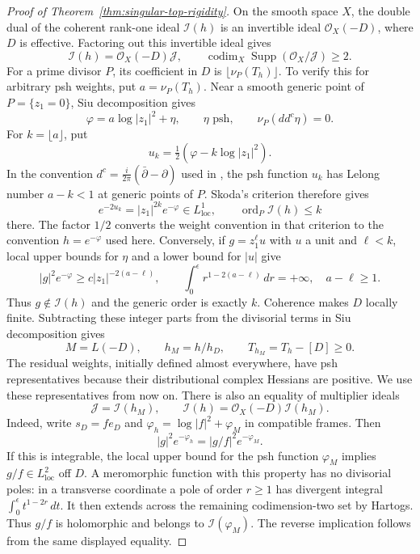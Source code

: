 \documentclass[11pt,reqno]{amsart}
\numberwithin{equation}{section}
\theoremstyle{definition}
\theoremstyle{remark}
\begin{document}
\begin{proof}[Proof of Theorem~\ref{thm:singular-top-rigidity}]
On the smooth space $X$, the double dual of the coherent rank-one ideal
$\mathcal I(h)$ is an invertible ideal $\mathcal O_X(-D)$, where $D$ is
effective. Factoring out this invertible ideal gives
\begin{equation}\label{eq:divisorial-ideal-factorization}
 \mathcal I(h)=\mathcal O_X(-D)\mathcal J,
 \qquad
 \operatorname{codim}_X
 \operatorname{Supp}(\mathcal O_X/\mathcal J)\geq2.
\end{equation}
For a prime divisor $P$, its coefficient in $D$ is
$\lfloor\nu_P(T_h)\rfloor$. To verify this for arbitrary psh weights,
put $a=\nu_P(T_h)$. Near a smooth generic point of $P=\{z_1=0\}$,
Siu decomposition gives
\[
 \varphi=a\log|z_1|^2+\eta,\qquad
 \eta\text{ psh},\qquad \nu_P(dd^c\eta)=0.
\]
For $k=\lfloor a\rfloor$, put
\[
 u_k=\tfrac12(\varphi-k\log|z_1|^2).
\]
In the convention $d^c=\tfrac{i}{2\pi}(\bar\partial-\partial)$
used in \cite{Dem12}, the psh function $u_k$ has Lelong number
$a-k<1$ at generic points of $P$.  Skoda's criterion
\cite[Lemma~5.6(a)]{Dem12} therefore gives
\[
 e^{-2u_k}=|z_1|^{2k}e^{-\varphi}\in L^1_{\mathrm{loc}},
 \qquad \operatorname{ord}_P\mathcal I(h)\leq k
\]
there.  The factor $1/2$ converts the weight convention in that
criterion to the convention $h=e^{-\varphi}$ used here.
Conversely, if $g=z_1^\ell u$ with $u$ a unit and $\ell<k$, local
upper bounds for $\eta$ and a lower bound for $|u|$ give
\[
 |g|^2e^{-\varphi}\geq c|z_1|^{-2(a-\ell)},\qquad
 \int_0^\epsilon r^{1-2(a-\ell)}\,dr=+\infty,
 \quad a-\ell\geq1.
\]
Thus $g\notin\mathcal I(h)$ and the generic order is exactly $k$.
Coherence makes $D$ locally finite. Subtracting these integer parts
from the divisorial terms in Siu decomposition gives
\begin{equation}\label{eq:residual-positive-current}
 M=L(-D),\qquad h_M=h/h_D,
 \qquad T_{h_M}=T_h-[D]\geq0.
\end{equation}
The residual weights, initially defined almost everywhere, have psh
representatives because their distributional complex Hessians are
positive.  We use these representatives from now on.
There is also an equality of multiplier ideals
\[
 \mathcal J=\mathcal I(h_M),\qquad
 \mathcal I(h)=\mathcal O_X(-D)\mathcal I(h_M).
\]
Indeed, write $s_D=f e_D$ and
$\varphi_h=\log|f|^2+\varphi_M$ in compatible frames. Then
\[
 |g|^2e^{-\varphi_h}=|g/f|^2e^{-\varphi_M}.
\]
If this is integrable, the local upper bound for the psh function
$\varphi_M$ implies $g/f\in L^2_{\mathrm{loc}}$ off $D$. A meromorphic
function with this property has no divisorial poles: in a transverse
coordinate a pole of order $r\geq1$ has divergent integral
$\int_0^\epsilon t^{1-2r}\,dt$. It then extends across the remaining
codimension-two set by Hartogs. Thus $g/f$ is holomorphic and belongs
to $\mathcal I(\varphi_M)$. The reverse implication follows from the
same displayed equality.


\end{proof}
\end{document}
